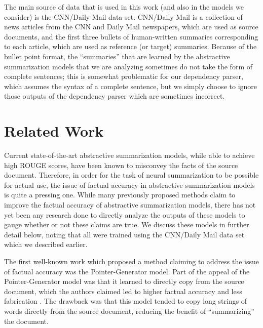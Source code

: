 \documentclass{article}
\begin{document}
The main source of data that is used in this work (and also in the models we consider) is the CNN/Daily Mail data set. CNN/Daily Mail is a collection of news articles from the CNN and Daily Mail newspapers, which are used as source documents, and the first three bullets of human-written summaries corresponding to each article, which are used as reference (or target) summaries. Because of the bullet point format, the ``summaries'' that are learned by the abstractive summarization models that we are analyzing sometimes do not take the form of complete sentences; this is somewhat problematic for our dependency parser, which assumes the syntax of a complete sentence, but we simply choose to ignore those outputs of the dependency parser which are sometimes incorrect.
\section{Related Work}
\label{sec:related}

Current state-of-the-art abstractive summarization models, while able to achieve high ROUGE scores, have been known to misconvey the facts of the source document. Therefore, in order for the task of neural summarization to be possible for actual use, the issue of factual accuracy in abstractive summarization models is quite a pressing one. While many previously proposed methods claim to improve the factual accuracy of abstractive summarization models, there has not yet been any research done to directly analyze the outputs of these models to gauge whether or not these claims are true. We discuss these models in further detail below, noting that all were trained using the CNN/Daily Mail data set which we described earlier.

The first well-known work which proposed a method claiming to address the issue of factual accuracy was the Pointer-Generator model. Part of the appeal of the Pointer-Generator model was that it learned to directly copy from the source document, which the authors claimed led to higher factual accuracy and less fabrication \cite{see2017get}. The drawback was that this model tended to copy long strings of words directly from the source document, reducing the benefit of ``summarizing'' the document. 
\end{document}
